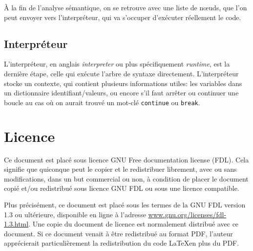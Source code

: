 \documentclass{article}
\begin{document}
À la fin de l’analyse sémantique, on se retrouve avec une liste de nœuds, que l’on peut envoyer
vers l’interpréteur, qui va s’occuper d’exécuter réellement le code.

\subsection{Interpréteur}
L’interpréteur, en anglais \textit{interpreter} ou plus spécifiquement \textit{runtime}, est la dernière
étape, celle qui exécute l’arbre de syntaxe directement.
L’interpréteur stocke un contexte, qui contient plusieurs informations utiles\nobreakspace:
les variables dans un dictionnaire identifiant/valeurs, ou encore s’il faut arrêter ou continuer
une boucle au cas où on aurait trouvé un mot-clé \verb|continue| ou \verb|break|.

\printbibliography

\section*{Licence}
Ce document est placé sous licence GNU Free documentation license (FDL).
Cela signifie que quiconque peut le copier et le redistribuer librement, avec ou
sans modifications, dans un but commercial ou non, à condition de placer le
document copié et/ou redistribué sous licence GNU FDL ou sous une licence
compatible.

Plus précisément, ce document est placé sous les termes de la GNU FDL version 1.3 ou
ultérieure, disponible en ligne à l’adresse
\href{www.gnu.org/licenses/fdl-1.3.html}{www.gnu.org/licenses/fdl-1.3.html}.
Une copie du document de licence est normalement distribué avec ce document.
Si ce document venait à être redistribué au format PDF, l’auteur apprécierait
particulièrement la redistribution du code \LaTeX\nobreakspace en plus du PDF.
\end{document}

